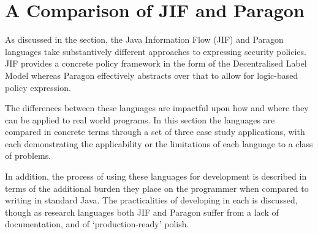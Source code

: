 \chapter{A Comparison of JIF and Paragon}

As discussed in the  section, the Java Information Flow (JIF) and Paragon languages take substantively different approaches to expressing security policies. JIF provides a concrete policy framework in the form of the Decentralised Label Model whereas Paragon effectively abstracts over that to allow for logic-based policy expression.

The differences between these languages are impactful upon how and where they can be applied to real world programs. In this section the languages are compared in concrete terms through a set of three case study applications, with each demonstrating the applicability or the limitations of each language to a class of problems.

In addition, the process of using these languages for development is described in terms of the additional burden they place on the programmer when compared to writing in standard Java. The practicalities of developing in each is discussed, though as research languages both JIF and Paragon suffer from a lack of documentation, and of `production-ready' polish.

\newpage



\newpage



\newpage



\newpage



\newpage

